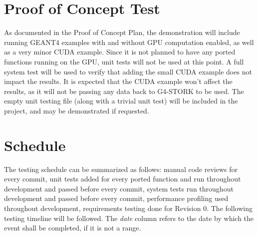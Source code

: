 \documentclass[12pt]{article}
\begin{document}
\section{Proof of Concept Test}
As documented in the Proof of Concept Plan, the demonstration will include running GEANT4 examples with and without GPU computation enabled, as well as a very minor CUDA example. Since it is not planned to have any ported functions running on the GPU, unit tests will not be used at this point. A full system test will be used to verify that adding the small CUDA example does not impact the results. It is expected that the CUDA example won't affect the results, as it will not be passing any data back to G4-STORK to be used. The empty unit testing file (along with a trivial unit test) will be included in the project, and may be demonstrated if requested.

\section{Schedule}
The testing schedule can be summarized as follows: manual code reviews for every commit, unit tests added for every ported function and run throughout development and passed before every commit, system tests run throughout development and passed before every commit, performance profiling used throughout development, requirements testing done for Revision 0. The following testing timeline will be followed. The \emph{date} column refers to the date by which the event shall be completed, if it is not a range.
\end{document}
